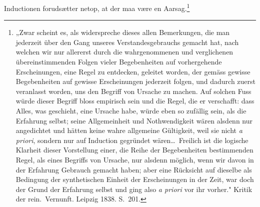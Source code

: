 \documentclass[12pt]{article}
\begin{document}
Inductionen forudsætter netop, at der maa være en Aarsag.\footnote{%
„Zwar scheint es, als widerspreche dieses allen Bemerkungen, die man
jederzeit über den Gang unseres Verstandesgebrauchs gemacht hat, nach
welchen wir nur allererst durch die wahrgenommenen und verglichenen
übereinstimmenden Folgen vieler Begebenheiten auf vorhergehende
Erscheinungen, eine Regel zu entdecken, geleitet worden, der gemäss gewisse
Begebenheiten auf gewisse Erscheinungen jederzeit folgen, und dadurch
zuerst veranlasst worden, uns den Begriff von Ursache zu machen. Auf
solchen Fuss würde dieser Begriff bloss empirisch sein und die Regel,
die er verschafft: dass Alles, was geschieht, eine Ursache habe, würde
eben so zufällig sein, als die Erfahrung selbst; seine Allgemeinheit und
Nothwendigkeit wären alsdenn nur angedichtet und hätten keine wahre
allgemeine Gültigkeit, weil sie nicht \textit{a priori}, sondern nur auf Induction
gegründet wären\ldots\ Freilich ist die logische Klarheit dieser
Vorstellung einer, die Reihe der Begebenheiten bestimmenden Regel, als
eines Begriffs von Ursache, nur alsdenn möglich, wenn wir davon in
der Erfahrung Gebrauch gemacht haben; aber eine Rücksicht auf die\-selbe
als Bedingung der synthetischen Einheit der Erscheinungen in der
Zeit, war doch der Grund der Erfahrung selbst und ging also \textit{a priori}
vor ihr vorher." Kritik der rein.\ Vernunft. Leipzig 1838. S.~201.}
\end{document}
